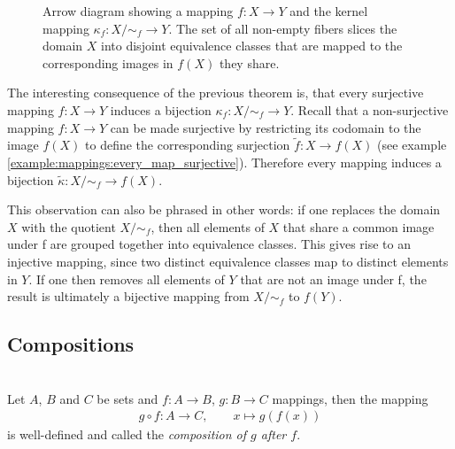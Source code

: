\begin{figure}[ht]
    \caption{Arrow diagram showing a mapping $f\colon X\rightarrow Y$ and the kernel mapping $\kappa_f\colon X/{\sim_f}\rightarrow Y$. The set of all non-empty fibers slices the domain $X$ into disjoint equivalence classes that are mapped to the corresponding images in $f(X)$ they share.}
\end{figure}

The interesting consequence of the previous theorem is, that every surjective mapping $f\colon X\rightarrow Y$ induces a bijection $\kappa_f\colon X/{\sim_f}\rightarrow Y$. Recall that a non-surjective mapping $f\colon X\rightarrow Y$ can be made surjective by restricting its codomain to the image $f(X)$ to define the corresponding surjection $\tilde f\colon X\rightarrow f(X)$ (see example \ref{example:mappings:every_map_surjective}). Therefore every mapping induces a bijection $\tilde \kappa\colon X/{\sim_f}\rightarrow f(X)$.

This observation can also be phrased in other words: if one replaces the domain $X$ with the quotient $X/{\sim_f}$, then all elements of $X$ that share a common image under f are grouped together into equivalence classes. This gives rise to an injective mapping, since two distinct equivalence classes map to distinct elements in $Y$. If one then removes all elements of $Y$ that are not an image under f, the result is ultimately a bijective mapping from $X/{\sim_f}$ to $f(Y)$.

\subsection{Compositions}

\begin{definition}[Compositions]~\\
    Let $A$, $B$ and $C$ be sets and $f\colon A\rightarrow B$, $g\colon B\rightarrow C$ mappings, then the mapping
    \begin{align}g\circ f\colon A\rightarrow C,\qquad x\mapsto g(f(x))\end{align}
    is well-defined and called the \emph{composition of $g$ after $f$}.
\end{definition}

